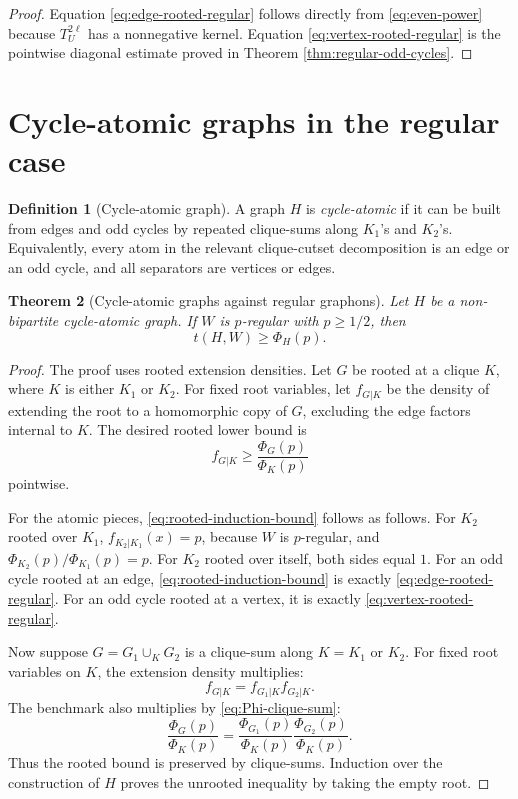 \documentclass[11pt]{article}
\newtheorem{theorem}{Theorem}[section]
\theoremstyle{definition}
\newtheorem{definition}[theorem]{Definition}
\begin{document}
\begin{proof}
Equation \eqref{eq:edge-rooted-regular} follows directly from \eqref{eq:even-power} because $T_U^{2\ell}$ has a nonnegative kernel.  Equation \eqref{eq:vertex-rooted-regular} is the pointwise diagonal estimate proved in Theorem \ref{thm:regular-odd-cycles}.
\end{proof}

\section{Cycle-atomic graphs in the regular case}

\begin{definition}[Cycle-atomic graph]
A graph $H$ is \emph{cycle-atomic} if it can be built from edges and odd cycles by repeated clique-sums along $K_1$'s and $K_2$'s.  Equivalently, every atom in the relevant clique-cutset decomposition is an edge or an odd cycle, and all separators are vertices or edges.
\end{definition}

\begin{theorem}[Cycle-atomic graphs against regular graphons]\label{thm:cycle-atomic-regular}
Let $H$ be a non-bipartite cycle-atomic graph.  If $W$ is $p$-regular with $p\ge1/2$, then
\[
  t(H,W)\ge \Phi_H(p).
\]
\end{theorem}

\begin{proof}
The proof uses rooted extension densities.  Let $G$ be rooted at a clique $K$, where $K$ is either $K_1$ or $K_2$.  For fixed root variables, let $f_{G|K}$ be the density of extending the root to a homomorphic copy of $G$, excluding the edge factors internal to $K$.  The desired rooted lower bound is
\begin{equation}\label{eq:rooted-induction-bound}
  f_{G|K}\ge \frac{\Phi_G(p)}{\Phi_K(p)}
\end{equation}
pointwise.

For the atomic pieces, \eqref{eq:rooted-induction-bound} follows as follows.  For $K_2$ rooted over $K_1$, $f_{K_2|K_1}(x)=p$, because $W$ is $p$-regular, and $\Phi_{K_2}(p)/\Phi_{K_1}(p)=p$.  For $K_2$ rooted over itself, both sides equal $1$.  For an odd cycle rooted at an edge, \eqref{eq:rooted-induction-bound} is exactly \eqref{eq:edge-rooted-regular}.  For an odd cycle rooted at a vertex, it is exactly \eqref{eq:vertex-rooted-regular}.

Now suppose $G=G_1\cup_K G_2$ is a clique-sum along $K=K_1$ or $K_2$.  For fixed root variables on $K$, the extension density multiplies:
\[
  f_{G|K}=f_{G_1|K}f_{G_2|K}.
\]
The benchmark also multiplies by \eqref{eq:Phi-clique-sum}:
\[
  \frac{\Phi_G(p)}{\Phi_K(p)}
  =\frac{\Phi_{G_1}(p)}{\Phi_K(p)}
   \frac{\Phi_{G_2}(p)}{\Phi_K(p)}.
\]
Thus the rooted bound is preserved by clique-sums.  Induction over the construction of $H$ proves the unrooted inequality by taking the empty root.
\end{proof}
\end{document}
